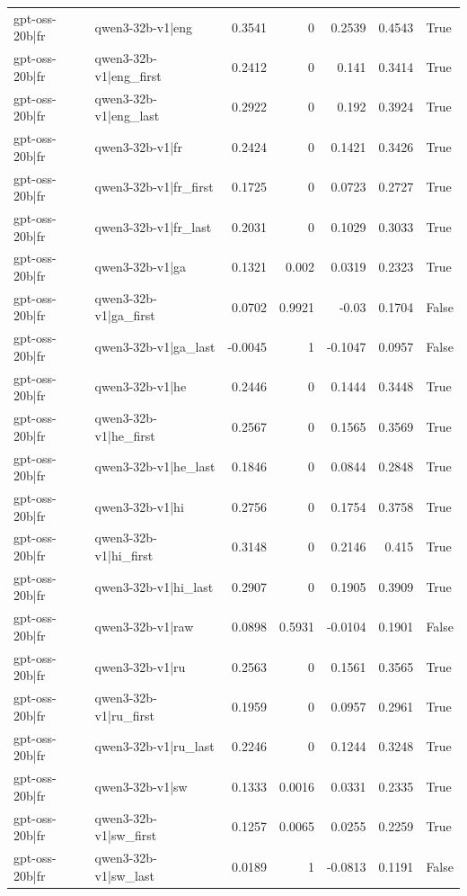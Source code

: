 \begin{table}
\begin{tabular}{l l r r r r l}
gpt-oss-20b|fr & qwen3-32b-v1|eng & 0.3541 & 0 & 0.2539 & 0.4543 & True \\
gpt-oss-20b|fr & qwen3-32b-v1|eng_first & 0.2412 & 0 & 0.141 & 0.3414 & True \\
gpt-oss-20b|fr & qwen3-32b-v1|eng_last & 0.2922 & 0 & 0.192 & 0.3924 & True \\
gpt-oss-20b|fr & qwen3-32b-v1|fr & 0.2424 & 0 & 0.1421 & 0.3426 & True \\
gpt-oss-20b|fr & qwen3-32b-v1|fr_first & 0.1725 & 0 & 0.0723 & 0.2727 & True \\
gpt-oss-20b|fr & qwen3-32b-v1|fr_last & 0.2031 & 0 & 0.1029 & 0.3033 & True \\
gpt-oss-20b|fr & qwen3-32b-v1|ga & 0.1321 & 0.002 & 0.0319 & 0.2323 & True \\
gpt-oss-20b|fr & qwen3-32b-v1|ga_first & 0.0702 & 0.9921 & -0.03 & 0.1704 & False \\
gpt-oss-20b|fr & qwen3-32b-v1|ga_last & -0.0045 & 1 & -0.1047 & 0.0957 & False \\
gpt-oss-20b|fr & qwen3-32b-v1|he & 0.2446 & 0 & 0.1444 & 0.3448 & True \\
gpt-oss-20b|fr & qwen3-32b-v1|he_first & 0.2567 & 0 & 0.1565 & 0.3569 & True \\
gpt-oss-20b|fr & qwen3-32b-v1|he_last & 0.1846 & 0 & 0.0844 & 0.2848 & True \\
gpt-oss-20b|fr & qwen3-32b-v1|hi & 0.2756 & 0 & 0.1754 & 0.3758 & True \\
gpt-oss-20b|fr & qwen3-32b-v1|hi_first & 0.3148 & 0 & 0.2146 & 0.415 & True \\
gpt-oss-20b|fr & qwen3-32b-v1|hi_last & 0.2907 & 0 & 0.1905 & 0.3909 & True \\
gpt-oss-20b|fr & qwen3-32b-v1|raw & 0.0898 & 0.5931 & -0.0104 & 0.1901 & False \\
gpt-oss-20b|fr & qwen3-32b-v1|ru & 0.2563 & 0 & 0.1561 & 0.3565 & True \\
gpt-oss-20b|fr & qwen3-32b-v1|ru_first & 0.1959 & 0 & 0.0957 & 0.2961 & True \\
gpt-oss-20b|fr & qwen3-32b-v1|ru_last & 0.2246 & 0 & 0.1244 & 0.3248 & True \\
gpt-oss-20b|fr & qwen3-32b-v1|sw & 0.1333 & 0.0016 & 0.0331 & 0.2335 & True \\
gpt-oss-20b|fr & qwen3-32b-v1|sw_first & 0.1257 & 0.0065 & 0.0255 & 0.2259 & True \\
gpt-oss-20b|fr & qwen3-32b-v1|sw_last & 0.0189 & 1 & -0.0813 & 0.1191 & False \\

\end{tabular}
\end{table}
